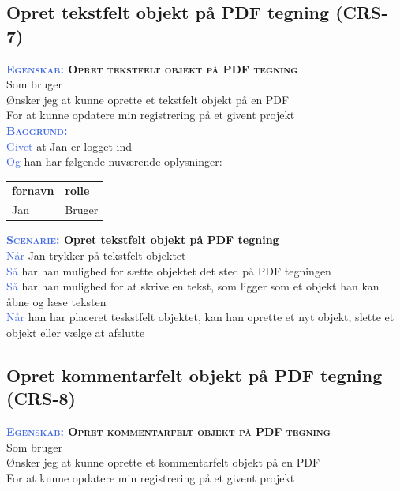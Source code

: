 \clearpage

\subsection{Opret tekstfelt objekt på PDF tegning (CRS-7)} \label{sec:USOpretTekstfelt}
\textbf{\textsc{\textcolor{RoyalBlue}{Egenskab:} Opret tekstfelt objekt på PDF tegning}}\\
Som bruger\\
Ønsker jeg at kunne oprette et tekstfelt objekt på en PDF\\
For at kunne opdatere min registrering på et givent projekt \\

\textsc{\textcolor{RoyalBlue}{\textbf{Baggrund:}}}\\
\textcolor{RoyalBlue}{Givet} at Jan er logget ind\\
\textcolor{RoyalBlue}{Og} han har følgende nuværende oplysninger:\\
\begin{tabular}{| l | l |}
	\textbf{fornavn} & \textbf{rolle} \\
	Jan & Bruger\\
\end{tabular}

\textbf{\textsc{\textcolor{RoyalBlue}{Scenarie:}} Opret tekstfelt objekt på PDF tegning}\\
\textcolor{RoyalBlue}{Når} Jan trykker på tekstfelt objektet\\
\textcolor{RoyalBlue}{Så}  har han mulighed for sætte objektet det sted på PDF tegningen\\
\textcolor{RoyalBlue}{Så}  har han mulighed for at skrive en tekst, som ligger som et objekt han kan åbne og læse teksten\\
\textcolor{RoyalBlue}{Når} han har placeret teskstfelt objektet, kan han oprette et nyt objekt, slette et objekt eller vælge at afslutte \\

\subsection{Opret kommentarfelt objekt på PDF tegning (CRS-8)} \label{sec:USOpretKommentarfelt}
\textbf{\textsc{\textcolor{RoyalBlue}{Egenskab:} Opret kommentarfelt objekt på PDF tegning}}\\
Som bruger\\
Ønsker jeg at kunne oprette et kommentarfelt objekt på en PDF\\
For at kunne opdatere min registrering på et givent projekt \\


